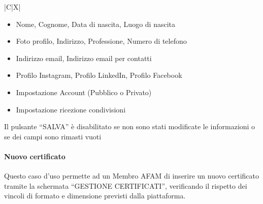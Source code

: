 \begin{tabularx}{\textwidth}{|C|X|}
{\begin{itemize}
    \item Nome, Cognome, Data di nascita, Luogo di nascita
    \item Foto profilo, Indirizzo, Professione, Numero di telefono
    \item Indirizzo email, Indirizzo email per contatti
    \item Profilo Instagram, Profilo LinkedIn, Profilo Facebook
    \item Impostazione Account (Pubblico o Privato)
    \item Impostazione ricezione condivisioni
\end{itemize}
Il pulsante ``SALVA'' è disabilitato se non sono stati modificate le informazioni o se dei campi sono rimasti vuoti}
\hline
\end{tabularx}

\clearpage

\paragraph{Nuovo certificato}
\par{\noindent Questo caso d'uso permette ad un Membro AFAM di inserire un nuovo certificato tramite la schermata ``GESTIONE CERTIFICATI'', verificando il rispetto dei vincoli di formato e dimensione previsti dalla piattaforma.}

